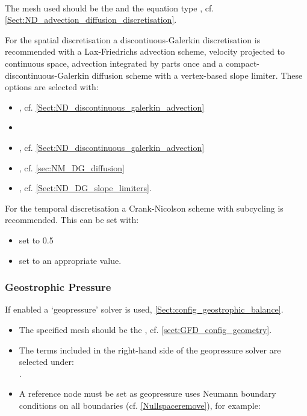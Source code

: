 {\bf \PoDGPt} \\

The mesh used should be the  and the equation type , cf. \ref{Sect:ND_advection_diffusion_discretisation}. 

For the spatial discretisation a discontiuous-Galerkin discretisation
is recommended with a Lax-Friedrichs advection scheme, velocity
projected to continuous space, advection integrated by parts once and
a compact-discontinuous-Galerkin diffusion scheme with a vertex-based
slope limiter. These options are selected with:
\begin{itemize}
\item{, cf. \ref{Sect:ND_discontinuous_galerkin_advection}}
\item{}
\item{, cf. \ref{Sect:ND_discontinuous_galerkin_advection}}
\item{, cf. \ref{sec:NM_DG_diffusion}}
\item{, cf. \ref{Sect:ND_DG_slope_limiters}.}
\end{itemize}

For the temporal discretisation a Crank-Nicolson scheme with subcycling is recommended. This can be set with:
\begin{itemize}
\item{ set to 0.5}
\item{ set to an appropriate value.}
\end{itemize}


\subsubsection{Geostrophic Pressure}
\label{Sect:GFD_config_geopressure}
If enabled a `geopressure' solver is used, \ref{Sect:config_geostrophic_balance}. 
\begin{itemize}
\item The specified mesh should be the , cf. \ref{sect:GFD_config_geometry}. 
\item The terms included in the right-hand side of the geopressure solver are selected under: \\
.
\item A reference node must be set as geopressure uses Neumann boundary conditions on all boundaries (cf. \ref{Nullspaceremove}), for example:
\end{itemize}

